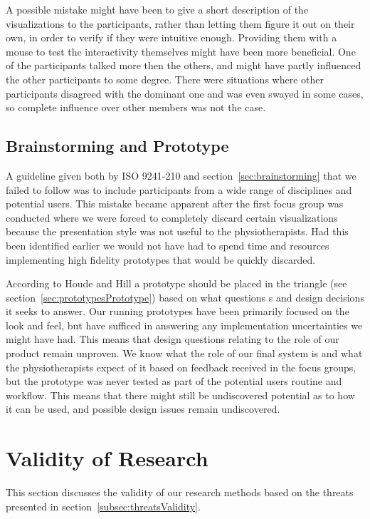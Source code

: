 A possible mistake might have been to give a short description of the visualizations to the participants, rather than letting them figure it out on their own, in order to verify if they were intuitive enough. Providing them with a mouse to test the interactivity themselves might have been more beneficial. One of the participants talked more then the others, and might have partly influenced the other participants to some degree. There were situations where other participants disagreed with the dominant one and was even swayed in some cases, so complete influence over other members was not the case.

\subsection{Brainstorming and Prototype}
A guideline given both by ISO 9241-210 and section~\ref{sec:brainstorming} that we failed to follow was to include participants from a wide range of disciplines and potential users. This mistake became apparent after the first focus group was conducted where we were forced to completely discard certain visualizations because the presentation style was not useful to the physiotherapists. Had this been identified earlier we would not have had to spend time and resources implementing high fidelity prototypes that would be quickly discarded.

According to Houde and Hill a prototype should be placed in the triangle (see section~\ref{sec:prototypesPrototype}) based on what questions s and design decisions it seeks to answer. Our running prototypes have been primarily focused on the look and feel, but have sufficed in answering any implementation uncertainties we might have had. This means that design questions relating to the role of our product remain unproven. We know what the role of our final system is and what the physiotherapists expect of it based on feedback received in the focus groups, but the prototype was never tested as part of the potential users routine and workflow. This means that there might still be undiscovered potential as to how it can be used, and possible design issues remain undiscovered.

\section{Validity of Research}
This section discusses the validity of our research methods based on the threats presented in section~\ref{subsec:threatsValidity}.

